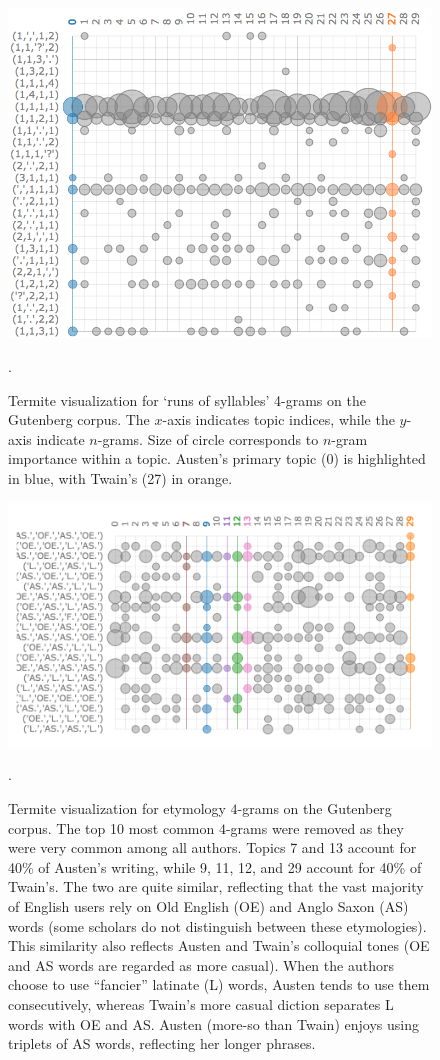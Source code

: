 \documentclass[14pt]{article} %
\theoremstyle{plain}
\theoremstyle{definition}
\theoremstyle{remark}
\begin{document}
\begin{figure}
\centering
\includegraphics[width=0.5\linewidth]{termite.png}
\caption{Termite visualization for `runs of syllables' 4-grams on the Gutenberg corpus. The $x$-axis indicates topic indices, while the $y$-axis indicate $n$-grams. Size of circle corresponds to $n$-gram importance within a topic. Austen's primary topic (0) is highlighted in blue, with Twain's (27) in orange.}
\label{fig:termite}.
\end{figure}

\begin{figure}
\centering
\includegraphics[width=0.6\linewidth]{termite2.png}
\caption{Termite visualization for etymology $4$-grams on the Gutenberg corpus. The top 10 most common $4$-grams were removed as they were very common among all authors. Topics 7 and 13 account for 40\% of  Austen's writing, while 9, 11, 12, and 29 account for 40\% of Twain's. The two are quite similar, reflecting that the vast majority of English users rely on Old English (OE) and Anglo Saxon (AS) words (some scholars do not distinguish between these etymologies). This similarity also reflects Austen and Twain's colloquial tones (OE and AS words are regarded as more casual). When the authors choose to use ``fancier'' latinate (L) words, Austen tends to use them consecutively, whereas Twain's more casual diction separates L words with OE and AS. Austen (more-so than Twain) enjoys using triplets of AS words, reflecting her longer phrases.}
\label{fig:termite2}.
\end{figure}
\end{document}
